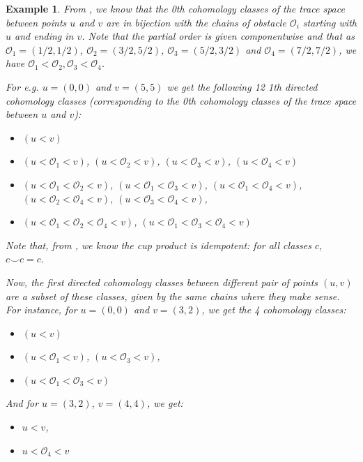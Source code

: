 \documentclass{article}
\newtheorem{example}[definition]{Example} %
\begin{document}
\begin{example}
From \cite{Barychnikov}, we know that the 0th cohomology classes of the trace space between points $u$ and $v$ are in bijection with the chains of obstacle $\mathcal{O}_i$ starting with $u$ and ending in $v$. Note that the partial order is given componentwise and that as $\mathcal{O}_1=(1/2,1/2)$, $\mathcal{O}_2=(3/2,5/2)$, $\mathcal{O}_3=(5/2,3/2)$ and $\mathcal{O}_4=(7/2,7/2)$, we have $\mathcal{O}_1 < \mathcal{O}_2, \mathcal{O}_3 < \mathcal{O}_4$. 

For e.g. $u=(0,0)$ and $v=(5,5)$ we get the following 12 1th directed cohomology classes (corresponding to the 0th cohomology classes of the trace space between $u$ and $v$):
\begin{itemize}
    \item $(u < v)$
    \item $(u < \mathcal{O}_1 < v)$, $(u < \mathcal{O}_2 < v)$, $(u < \mathcal{O}_3 < v)$, $(u < \mathcal{O}_4 < v)$
    \item $(u < \mathcal{O}_1 < \mathcal{O}_2 < v)$, $(u < \mathcal{O}_1 < \mathcal{O}_3 < v)$, 
    $(u < \mathcal{O}_1 < \mathcal{O}_4 < v)$, 
    $(u < \mathcal{O}_2 < \mathcal{O}_4 < v)$, 
    $(u < \mathcal{O}_3 < \mathcal{O}_4 < v)$, 
    \item $(u < \mathcal{O}_1 < \mathcal{O}_2 < \mathcal{O}_4 < v)$, 
    $(u < \mathcal{O}_1 < \mathcal{O}_3 < \mathcal{O}_4 < v)$
\end{itemize}
Note that, from \cite{Barychnikov}, we know the cup product is idempotent: for all classes $c$, $c\smile c=c$. 

Now, the first directed cohomology classes between different pair of points $(u,v)$ are a subset of these classes, given by the same chains where they make sense. For instance, for $u=(0,0)$ and $v=(3,2)$, we get the 4 cohomology classes:
\begin{itemize}
    \item $(u < v)$
    \item $(u < \mathcal{O}_1 < v)$, $(u < \mathcal{O}_3 < v)$, 
    \item $(u < \mathcal{O}_1 < \mathcal{O}_3 < v)$
\end{itemize}

And for $u=(3,2)$, $v=(4,4)$, we get:
\begin{itemize}
\item $u < v$,
\item $u < \mathcal{O}_4 < v$
\end{itemize}


\end{example}
\end{document}
